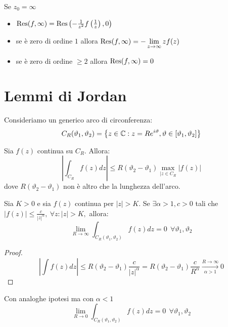 Se $z_{0} = \infty $
\begin{itemize}
\item $\operatorname{Res} (f, \infty) = \operatorname{Res} \left(- \frac{1}{z^{2}} f\left(\frac{1}{z}\right), 0\right)$
\item se è zero di ordine $1$ allora $\operatorname{Res} (f, \infty) = - \lim\limits_{z\rightarrow \infty} zf(z)$
\item se è zero di ordine $\geq 2$ allora $\operatorname{Res} (f, \infty) = 0$
\end{itemize}

\section{Lemmi di Jordan}

Consideriamo un generico arco di circonferenza:
\begin{equation*}
C_{R}(\vartheta_{1}, \vartheta_{2}) = \left\{z\in \mathbb{C} : z = Re^{i\vartheta}, \vartheta \in [\vartheta_{1}, \vartheta_{2}]\right\}
\end{equation*}
\begin{thm}
Sia $f(z)$ continua su $C_{R}$. Allora:
\begin{equation*}
\left| \int_{C_{R}} f(z)dz\right| \leq R(\vartheta_{2} - \vartheta_{1})\max_{|z\in C_{R}}| f(z)|
\end{equation*}
dove $R(\vartheta_{2} - \vartheta_{1})$ non è altro che la lunghezza dell'arco.
\end{thm}
\begin{thm}
Sia $K > 0$ e sia $f(z)$ continua per $|z| > K$. Se $\exists \alpha > 1, c > 0$ tali che $|f(z)|\leq \frac{c}{|z|^{\alpha}}, \ \forall z: |z| > K, $ allora:
\begin{equation*}
\lim_{R\rightarrow \infty}\int_{C_{R}(\vartheta_{1}, \vartheta_{2})} f(z)dz = 0\ \ \forall \vartheta_{1}, \vartheta_{2}
\end{equation*}
\end{thm}
\begin{proof}
\begin{equation*}
\left| \int f(z) dz\right| \leq R(\vartheta_{2} - \vartheta_{1})\frac{c}{|z|^{\alpha}} = R(\vartheta_{2} - \vartheta_{1})\frac{c}{R^{\alpha}}\xrightarrow[\alpha > 1]{R\rightarrow \infty} 0
\end{equation*}
\end{proof}
\begin{thm}
Con analoghe ipotesi ma con $\alpha < 1$
\begin{equation*}
\lim_{R\rightarrow 0}\int_{C_{R}(\vartheta_{1}, \vartheta_{2})} f(z)dz = 0\ \ \forall \vartheta_{1}, \vartheta_{2}
\end{equation*}
\end{thm}
